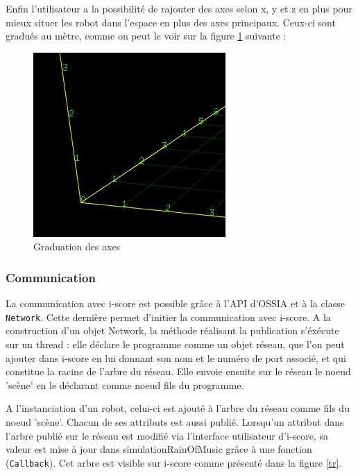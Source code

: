 Enfin l'utilisateur a la possibilité de rajouter des axes selon x, y et z en plus pour mieux situer les robot dans l'espace en plus des axes principaux. Ceux-ci sont gradués au mètre, comme on peut le voir sur la figure \ref{grad} suivante :
					
\begin{figure}[H]
\centering
\includegraphics[scale=0.8]{imgs/graduation}
\caption{Graduation des axes}
\label{grad}
\end{figure}

\subsubsection{Communication}

La communication avec i-score est possible grâce à l'API d'OSSIA et à la classe \verb|Network|. Cette dernière permet d'initier la communication avec i-score. A la construction d'un objet Network, la méthode réalisant la publication s'éxécute sur un thread : elle déclare le programme comme un objet réseau, que l'on peut ajouter dans i-score en lui donnant son nom et le numéro de port associé, et qui constitue la racine de l'arbre du réseau. Elle envoie ensuite sur le réseau le noeud 'scène' en le déclarant comme noeud fils du programme.

A l'instanciation d'un robot, celui-ci est ajouté à l'arbre du réseau comme fils du noeud 'scène'. Chacun de ses attributs est aussi publié. Lorsqu'un attribut dans l'arbre publié sur le réseau est modifié via l'interface utilisateur d'i-score, sa valeur est mise à jour dans simulationRainOfMusic grâce à une fonction (\verb|Callback|). Cet arbre est visible sur i-score comme présenté dans la figure \ref{tr}.


